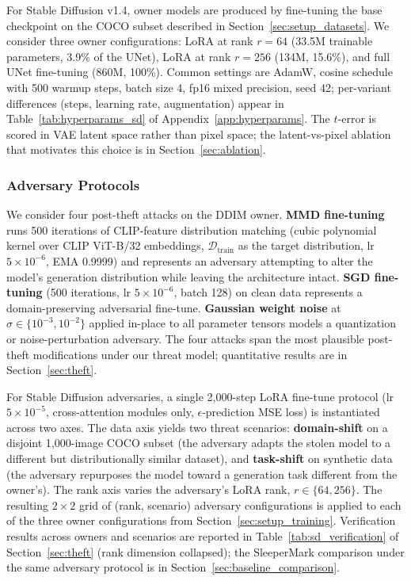 \documentclass{article}
\begin{document}
For Stable Diffusion v1.4, owner models are produced by fine-tuning the base checkpoint on the COCO subset described in Section~\ref{sec:setup_datasets}. We consider three owner configurations: LoRA at rank $r{=}64$ (33.5M trainable parameters, 3.9\% of the UNet), LoRA at rank $r{=}256$ (134M, 15.6\%), and full UNet fine-tuning (860M, 100\%). Common settings are AdamW, cosine schedule with 500 warmup steps, batch size 4, fp16 mixed precision, seed 42; per-variant differences (steps, learning rate, augmentation) appear in Table~\ref{tab:hyperparams_sd} of Appendix~\ref{app:hyperparams}. The $t$-error is scored in VAE latent space rather than pixel space; the latent-vs-pixel ablation that motivates this choice is in Section~\ref{sec:ablation}.

\subsubsection{Adversary Protocols}
\label{sec:setup_adversary}

We consider four post-theft attacks on the DDIM owner. \textbf{MMD fine-tuning} runs 500 iterations of CLIP-feature distribution matching (cubic polynomial kernel over CLIP ViT-B/32 embeddings, $\mathcal{D}_{\text{train}}$ as the target distribution, lr $5{\times}10^{-6}$, EMA 0.9999) and represents an adversary attempting to alter the model's generation distribution while leaving the architecture intact. \textbf{SGD fine-tuning} (500 iterations, lr $5{\times}10^{-6}$, batch 128) on clean data represents a domain-preserving adversarial fine-tune. \textbf{Gaussian weight noise} at $\sigma \in \{10^{-3}, 10^{-2}\}$ applied in-place to all parameter tensors models a quantization or noise-perturbation adversary. The four attacks span the most plausible post-theft modifications under our threat model; quantitative results are in Section~\ref{sec:theft}.

For Stable Diffusion adversaries, a single 2{,}000-step LoRA fine-tune protocol (lr $5{\times}10^{-5}$, cross-attention modules only, $\epsilon$-prediction MSE loss) is instantiated across two axes. The data axis yields two threat scenarios: \textbf{domain-shift} on a disjoint 1{,}000-image COCO subset (the adversary adapts the stolen model to a different but distributionally similar dataset), and \textbf{task-shift} on synthetic data (the adversary repurposes the model toward a generation task different from the owner's). The rank axis varies the adversary's LoRA rank, $r \in \{64, 256\}$. The resulting $2{\times}2$ grid of (rank, scenario) adversary configurations is applied to each of the three owner configurations from Section~\ref{sec:setup_training}. Verification results across owners and scenarios are reported in Table~\ref{tab:sd_verification} of Section~\ref{sec:theft} (rank dimension collapsed); the SleeperMark comparison under the same adversary protocol is in Section~\ref{sec:baseline_comparison}.
\end{document}
